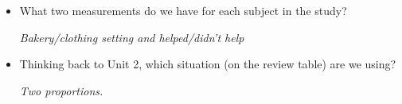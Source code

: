 \begin{itemize}
\item What two measurements do we have for each subject in the study?
\begin{students}
 \vspace{.8cm}
\end{students}

\begin{key}
 {\it Bakery/clothing setting and helped/didn't help}
\end{key}

\item Thinking back to Unit 2, which situation (on the review table)
  are we using?
\begin{students}
 \vspace{.8cm}
\end{students}

\begin{key}
 {\it Two proportions.}
\end{key}




\end{itemize}



